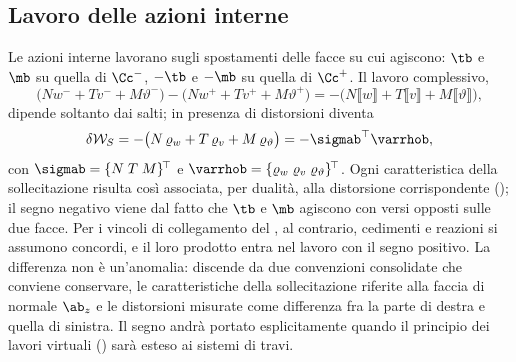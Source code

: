 \subsection{Lavoro delle azioni interne}
\label{sec:lavoro_azioni_interne}

Le azioni interne lavorano sugli spostamenti delle facce
su cui agiscono: $\tb$ e $\mb$ su quella di $\Cc^-$,
$-\tb$ e $-\mb$ su quella di $\Cc^+$. Il lavoro
complessivo,
\begin{equation*}
	\bigl(N w^- + T v^- + M \vartheta^-\bigr)
	- \bigl(N w^+ + T v^+ + M \vartheta^+\bigr)
	= -\bigl(N \llbracket w \rrbracket + T \llbracket v \rrbracket
	+ M \llbracket \vartheta \rrbracket\bigr),
\end{equation*}
dipende soltanto dai salti; in presenza di distorsioni
diventa
\begin{equation}\label{eq:lavoro_continuita}
	\delta\mathcal{W}_S =
	-\bigl(N\,\varrho_w + T\,\varrho_v + M\,\varrho_\vartheta\bigr)
	= -\sigmab^{\top}\varrhob,
\end{equation}
con $\sigmab = \{N\; T\; M\}^{\!\top}$
e $\varrhob = \{\varrho_w\; \varrho_v\; \varrho_\vartheta\}^{\!\top}$.
Ogni caratteristica della sollecitazione risulta così
associata, per dualità, alla distorsione corrispondente
(); il segno negativo
viene dal fatto che $\tb$ e $\mb$ agiscono con versi
opposti sulle due facce. Per i vincoli di collegamento
del , al contrario, cedimenti e
reazioni si assumono concordi, e il loro prodotto entra
nel lavoro con il segno positivo. La differenza non è
un'anomalia: discende da due convenzioni consolidate che
conviene conservare, le caratteristiche della
sollecitazione riferite alla faccia di normale $\ab_z$
e le distorsioni misurate come differenza fra la parte
di destra e quella di sinistra. Il segno andrà portato
esplicitamente quando il principio dei lavori virtuali
() sarà esteso ai sistemi di travi.



